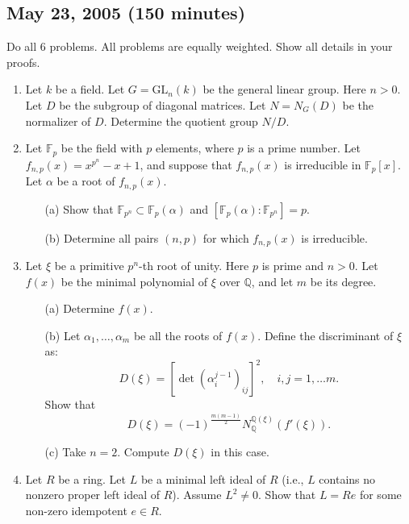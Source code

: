 \documentclass{article}
\begin{document}
\subsection*{May 23, 2005 (150 minutes)}

Do all 6 problems. All problems are equally weighted. Show all details in your proofs.

\begin{enumerate}
    \item Let \(k\) be a field. Let \(G = \text{GL}_n(k)\) be the general linear group. Here \(n > 0\). Let \(D\) be the subgroup of diagonal matrices. Let \(N = N_G(D)\) be the normalizer of \(D\). Determine the quotient group \(N/D\).

    \item Let \(\mathbb{F}_p\) be the field with \(p\) elements, where \(p\) is a prime number. Let \(f_{n,p}(x) = x^{p^n} - x + 1\), and suppose that \(f_{n,p}(x)\) is irreducible in \(\mathbb{F}_p[x]\). Let \(\alpha\) be a root of \(f_{n,p}(x)\).
    \begin{itemize}
        \item[(a)] Show that \(\mathbb{F}_{p^n} \subset \mathbb{F}_p(\alpha)\) and \([\mathbb{F}_p(\alpha) : \mathbb{F}_{p^n}] = p\).
        \item[(b)] Determine all pairs \((n, p)\) for which \(f_{n,p}(x)\) is irreducible.
    \end{itemize}

    \item Let \(\xi\) be a primitive \(p^n\)-th root of unity. Here \(p\) is prime and \(n > 0\). Let \(f(x)\) be the minimal polynomial of \(\xi\) over \(\mathbb{Q}\), and let \(m\) be its degree.
    \begin{itemize}
        \item[(a)] Determine \(f(x)\).
        \item[(b)] Let \(\alpha_1, \ldots, \alpha_m\) be all the roots of \(f(x)\). Define the discriminant of \(\xi\) as:
        \[D(\xi) = [\det(\alpha_i^{j-1})_{ij}]^2, \quad i, j = 1, \ldots m.\]
        Show that
        \[D(\xi) = (-1)^{\frac{m(m-1)}{2}} N_{\mathbb{Q}}^{\mathbb{Q}(\xi)}(f'(\xi)).\]
        \item[(c)] Take \(n = 2\). Compute \(D(\xi)\) in this case.
    \end{itemize}

    \item Let \(R\) be a ring. Let \(L\) be a minimal left ideal of \(R\) (i.e., \(L\) contains no nonzero proper left ideal of \(R\)). Assume \(L^2 \neq 0\). Show that \(L = Re\) for some non-zero idempotent \(e \in R\).


\end{enumerate}
\end{document}
